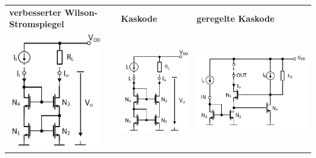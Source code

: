 \begin{tabular}{|p{}|p{}|p{}|}
	\hline
	\textbf{verbesserter Wilson-Stromspiegel}&\textbf{Kaskode}&\textbf{geregelte Kaskode}\\
	\includegraphics[height=5cm]{chapters/Stromspiegel/images/verbesserterWilson}&\includegraphics[height=5cm]{chapters/Stromspiegel/images/Kaskode}&\includegraphics[height=5cm]{chapters/Stromspiegel/images/geregelteKaskode}\\ \hline
\end{tabular}\\[2ex]
